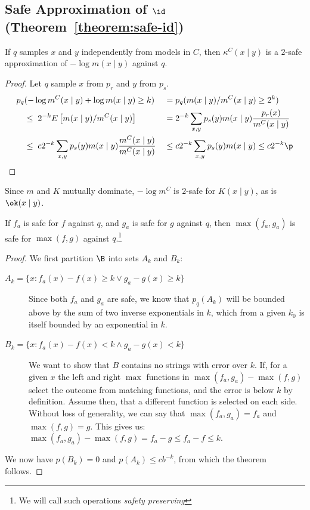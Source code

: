 \subsection{Safe Approximation of $\id$ (Theorem~\ref{theorem:safe-id})}

\begin{lemma}
If $q$ samples $x$ and $y$ independently from models in $C$, then $\kappa^C(x\mid y)$ is a $2$-safe approximation of $-\log m(x\mid y)$ against $q$.
\label{lemma:conditional-safety}  
\end{lemma}
\begin{proof}\belowdisplayskip=-12pt
Let $q$ sample $x$ from $p_r$ and $y$ from $p_s$.
\begin{align*}
p_q&(-\log m^C(x\mid y)  + \log m(x\mid y) \geq k) 		&&= p_q(m(x \mid y) / m^C(x \mid y) \geq 2^k) \\ 
&\leq \; 2^{-k}E\left[m(x\mid y)/m^C(x\mid y)\right] 	&&= 2^{-k} \sum_{x, y} p_s(y)m(x \mid y) \frac{p_r(x)}{m^C(x\mid y)}  \\
&\leq \; c 2^{-k} \sum_{x, y} p_s(y)m(x \mid y) \frac{m^C(x\mid y)}{m^C(x\mid y)} &&\leq c 2^{-k} \sum_{x, y} p_s(y)m(x \mid y) \leq c 2^{-k}\p
\end{align*} 
\end{proof}
Since $m$ and $K$ mutually dominate, $- \log m^C$ is $2$-safe for $K(x\mid y)$, as is $\ok(x\mid y)$.

\begin{lemma}
If $f_a$ is safe for $f$ against $q$, and $g_a$ is safe for $g$ against $q$, then $\max (f_a, g_a)$ is safe for $\max (f, g)$ against $q$.\footnote{We will call such operations \emph{safety preserving}}

\label{lemma:safety-preserving} 
\end{lemma}
\begin{proof}\belowdisplayskip=-12pt
We first partition $\B$ into sets $A_k$ and $B_k$:

\begin{description}
\item[$A_k = \{x:f_a(x) - f(x) \geq k \lor g_a - g(x) \geq k \}$] Since both $f_a$ and $g_a$ are safe, we know that $p_q(A_k)$ will be bounded above by the sum of two inverse exponentials in $k$, which from a given $k_0$ is itself bounded by an exponential in $k$.

\item[$B_k = \{x:f_a(x) - f(x) < k \wedge g_a - g(x) < k \}$] We want to show that $B$ contains no strings with error over $k$. If, for a given $x$ the left and right $\max$ functions in $\max \left(f_a, g_a\right) - \max \left(f, g\right)$ select the outcome from matching  functions, and the error is below $k$ by definition. Assume then, that a different function is selected on each side. Without loss of generality, we can say that $\max(f_a, g_a) = f_a$ and $\max(f, g)= g$. This gives us: $\max(f_a, g_a) - \max(f, g) = f_a - g \leq f_a - f \leq k$.
\end{description}
We now have $p(B_k) = 0$ and $p(A_k) \leq cb^{-k}$, from which the theorem follows.
\end{proof}


